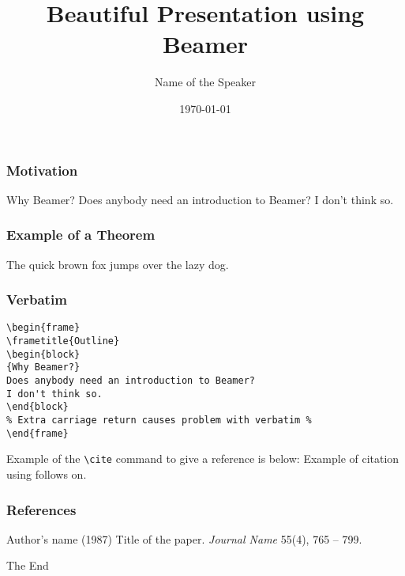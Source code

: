 \documentclass{beamer}
\title[Short title of the talk]{Beautiful Presentation using Beamer}
\author{Name of the Speaker}
\institute[U of X]
{
University of [...] \\
\medskip
{\emph{email@domain.ca}}
}
\date{\today}
\begin{document}
%
\begin{frame}
\titlepage
\end{frame}
%
\begin{frame}
\frametitle{Motivation}
\begin{block}
{Why Beamer?}
Does anybody need an introduction to Beamer? I don't think so.
\end{block}
\end{frame}
%
\begin{frame}
\frametitle{Example of a Theorem}
\begin{theorem}
The quick brown fox jumps over the lazy dog.
\end{theorem}
\end{frame}
%
\begin{frame}[fragile] %
\frametitle{Verbatim}
\begin{example}
\begin{verbatim}
\begin{frame}
\frametitle{Outline}
\begin{block}
{Why Beamer?}
Does anybody need an introduction to Beamer?
I don't think so.
\end{block}
% Extra carriage return causes problem with verbatim %
\end{frame}\end{verbatim}
\end{example}
\end{frame}

\begin{frame}[fragile]  %
Example of the \verb|\cite| command to give a reference is below:
Example of citation using \cite{key1} follows on.
\end{frame}

\begin{frame}
\frametitle{References}
\footnotesize{
\begin{thebibliography}{99}
  Author's name (1987)
 \newblock Title of the paper.
 \newblock \emph{Journal Name} 55(4), 765 -- 799.
\end{thebibliography}
}
\end{frame}

\begin{frame}
\centerline{The End}
\end{frame}
\end{document}
